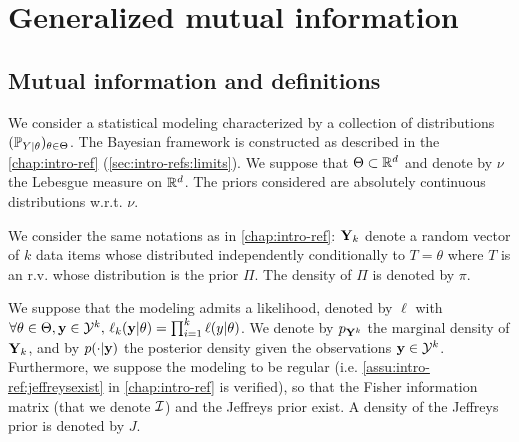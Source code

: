 \section{Generalized mutual information}\label{sec:PSGSA:genMI}

\subsection{Mutual information and definitions}


We consider a statistical modeling characterized by a collection of distributions $(\mathbb{P}_{Y|\theta})_{\theta\in\Theta}$. 
The Bayesian framework is constructed as described in the \cref{chap:intro-ref} (\cref{sec:intro-refs:limits}). We suppose that $\Theta\subset\mathbb{R}^d$ and denote by $\nu$ the Lebesgue measure on $\mathbb{R}^d$. 
The priors considered are absolutely continuous distributions w.r.t. $\nu$.

We consider the same notations as in \cref{chap:intro-ref}: $\mathbf{Y}_k$ denote a random vector of $k$ data items whose distributed independently conditionally to $T=\theta$ where $T$ is an r.v. whose distribution is the prior $\varPi$. The density of $\varPi$ is denoted by $\pi$.

We suppose that the modeling admits a likelihood, denoted by $\ell$ with $\forall\theta\in\Theta,\mathbf{y}\in\mathcal{Y}^k,\, \ell_k(\mathbf{y}|\theta)=\prod_{i=1}^k\ell(y|\theta) $. We denote by $p_{\mathbf{Y}^k}$ the marginal density of $\mathbf{Y}_k$, and by $p(\cdot|\mathbf{y})$ the posterior density given the observations $\mathbf{y}\in\mathcal{Y}^k$. %
Furthermore, we suppose the modeling to be regular (i.e. \cref{assu:intro-ref:jeffreysexist} in \cref{chap:intro-ref} is verified), so that the Fisher information matrix (that we denote $\mathcal{I}$) and the Jeffreys prior exist. A density of the Jeffreys prior is denoted by $J$.



